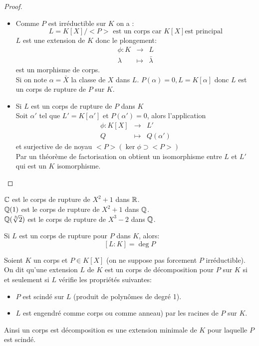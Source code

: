 \begin{proof}

	\begin{itemize}
		\item Comme $P$ est irréductible sur $K$ on a :
		      $$ L = K[X]/<P> \text{ est un corps car } K[X] \text{est principal}$$
		      $L$ est une extension de $K$ donc le plongement:
		      \begin{eqnarray*}
			      \phi: K &\to& L\\
			      \lambda   &\mapsto &\bar{\lambda}
		      \end{eqnarray*}
		      est un morphisme de corps.\\
		      Si on note $\alpha = \bar{X}$ la classe de $X$ dans $L$. $P(\alpha) = 0, L = K[\alpha]$
		      donc $L$ est un corps de rupture de $P$ sur $K$.
		\item Si $L$ est un corps de rupture de $P$ dans $K$ \\
		      Soit $\alpha'$ tel que $L' = K[\alpha']$ et $P(\alpha') = 0$, alors l'application
		      \begin{eqnarray*}
			      \phi : K[X] &\to& L'\\
			      Q &   \mapsto & Q(\alpha')
		      \end{eqnarray*}
		      et surjective de de noyau $<P> (\ker \phi \supset <P>)$\\
		      Par un théorème de factorisation on obtient un isomorphisme entre $L$ et $L'$ qui est un $K$ isomorphisme.
	\end{itemize}
\end{proof}

\begin{example}
	$\mathbb{C}$ est le corps de rupture de $X^2+1$ dans $\mathbb{R}$.\\
	$\mathbb{Q}(1)$ est le corps de rupture de $X^2+1$ dans $\mathbb{Q}$.\\
	$\mathbb{Q}(\sqrt[3]{2})$ est le corps de rupture de $X^3-2$ dans $\mathbb{Q}$.\\
\end{example}

\begin{remarque}[Important]
	Si $L$ est un corps de rupture pour $P$ dans $K$, alors:
	$$ [L : K] = \deg P$$
\end{remarque}


\begin{definition}
	Soient $K$ un corps et $P\in K[X]$ (on ne suppose pas forcement $P$ irréductible).\\
	On dit qu'une extension $L$ de $K$ est un corps de décomposition pour $P$ sur $K$ si et seulement si $L$ vérifie les propriétés suivantes:
	\begin{itemize}
		\item $P$ est scindé sur $L$ (produit de polynômes de degré 1).
		\item $L$ est engendré comme corps ou comme anneau) par les racines de $P$ sur $K$.
	\end{itemize}

	Ainsi un corps est décomposition es une extension minimale de $K$ pour laquelle $P$ est scindé.
\end{definition}

